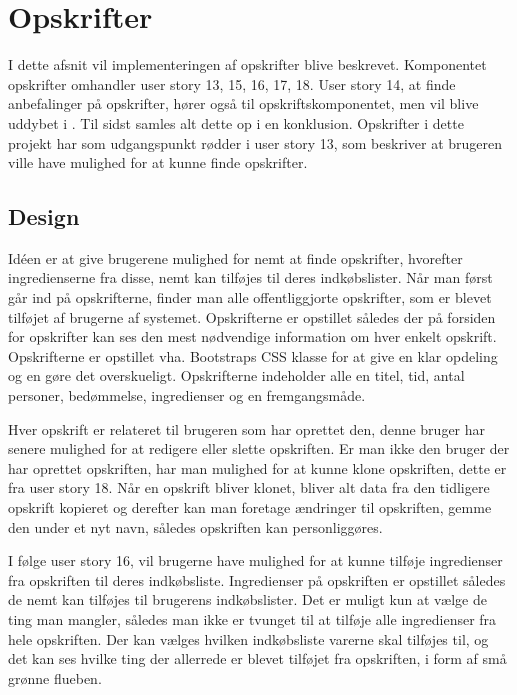 \section{Opskrifter}
I dette afsnit vil implementeringen af opskrifter blive beskrevet. Komponentet opskrifter omhandler user story 13, 15, 16, 17, 18.
User story 14, at finde anbefalinger på opskrifter, hører også til opskriftskomponentet, men vil blive uddybet i . Til sidst samles alt dette op i en konklusion. 
Opskrifter i dette projekt har som udgangspunkt rødder i user story 13, som beskriver at brugeren ville have mulighed for at kunne finde opskrifter.

\subsection{Design}
Idéen er at give brugerene mulighed for nemt at finde opskrifter, hvorefter ingredienserne fra disse, nemt kan tilføjes til deres indkøbslister.
Når man først går ind på opskrifterne, finder man alle offentliggjorte opskrifter, som er blevet tilføjet af brugerne af systemet.
Opskrifterne er opstillet således der på forsiden for opskrifter kan ses den mest nødvendige information om hver enkelt opskrift.
Opskrifterne er opstillet vha. Bootstraps CSS klasse  for at give en klar opdeling og en gøre det overskueligt.
Opskrifterne indeholder alle en titel, tid, antal personer, bedømmelse, ingredienser og en fremgangsmåde.

Hver opskrift er relateret til brugeren som har oprettet den, denne bruger har senere mulighed for at redigere eller slette opskriften.
Er man ikke den bruger der har oprettet opskriften, har man mulighed for at kunne klone opskriften, dette er fra user story 18.
Når en opskrift bliver klonet, bliver alt data fra den tidligere opskrift kopieret og derefter kan man foretage ændringer til opskriften, gemme den under et nyt navn, således opskriften kan personliggøres.

I følge user story 16, vil brugerne have mulighed for at kunne tilføje ingredienser fra opskriften til deres indkøbsliste.
Ingredienser på opskriften er opstillet således de nemt kan tilføjes til brugerens indkøbslister.
Det er muligt kun at vælge de ting man mangler, således man ikke er tvunget til at tilføje alle ingredienser fra hele opskriften.
Der kan vælges hvilken indkøbsliste varerne skal tilføjes til, og det kan ses hvilke ting der allerrede er blevet tilføjet fra opskriften, i form af små grønne flueben.

